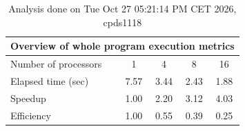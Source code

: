 \begin{table}[h]
\begin{center}
\begin{tabular}{|l|c|c|c|c|}
\hline
\multicolumn{5}{|c|}{Overview of whole program execution metrics} \\
\hline
\hline
Number of processors & 1 & 4 & 8 & 16 \\
\hline
Elapsed time (sec)      &       7.57 &       3.44 &       2.43 &       1.88 \\
\hline
Speedup                 &       1.00 &       2.20 &       3.12 &       4.03 \\
\hline
Efficiency              &       1.00 &       0.55 &       0.39 &       0.25 \\
\hline
\end{tabular}
\end{center}
\caption{ Analysis done on Tue Oct 27 05:21:14 PM CET 2026, cpds1118}
\end{table}
